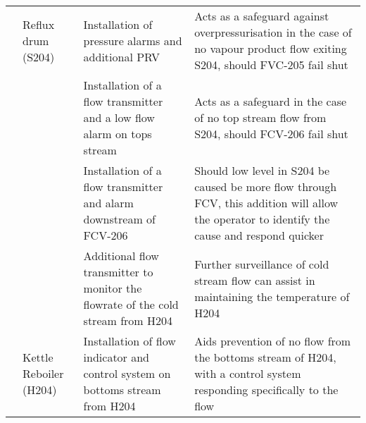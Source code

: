 {\begin{tabular}{@{}l>{\raggedright}p{2cm}p{7cm}p{10cm}@{}}
    & Reflux drum (S204)         & Installation of pressure alarms and additional PRV                                                                                &      Acts as a safeguard against overpressurisation in the case of no vapour product flow exiting S204, should FVC-205 fail shut                                                                                                                                                                                                        \\ \cmidrule(l){3-4} 
    &                           & Installation of a flow transmitter and a low flow alarm on tops stream                                                                                                                                                   &                          Acts as a safeguard in the case of no top stream flow from S204, should FCV-206 fail shut                                                                                                                                                                               \\ \cmidrule(l){3-4} 
    &                           &         Installation of a flow transmitter and alarm downstream of FCV-206                                                                                                                                                      &                    Should low level in S204 be caused be more flow through FCV, this addition will allow the operator to identify the cause and respond quicker                                                               \\ \cmidrule(l){3-4}
    &                            &  Additional flow transmitter to monitor the flowrate of the cold stream from H204    &  Further surveillance of cold stream flow can assist in maintaining the temperature of H204 
    \\ \cmidrule(l){2-4} 
    & Kettle Reboiler (H204)           &          Installation of flow indicator and control system on bottoms stream from H204                                                                                                                                                     &               Aids prevention of no flow from the bottoms stream of H204, with a control system responding specifically to the flow                                                                                                                                                                                               \\ \cmidrule(l){3-4} 

\end{tabular}}
